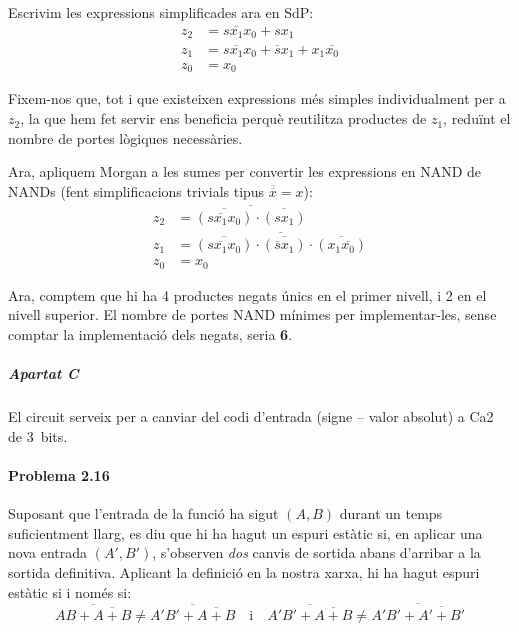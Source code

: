 Escrivim les expressions simplificades ara en SdP:
%
\begin{align*}
  z_2 &= s \overline{x_1} x_0 + s x_1 \\
  z_1 &= s \overline{x_1} x_0 + \overline{s} x_1 + x_1 \overline{x_0} \\
  z_0 &= x_0
\end{align*}

Fixem-nos que, tot i que existeixen expressions més simples individualment per a $z_2$, la que hem fet servir ens beneficia perquè reutilitza productes de $z_1$, reduïnt el nombre de portes lògiques necessàries.

Ara, apliquem Morgan a les sumes per convertir les expressions en \textsf{NAND} de \textsf{NAND}s (fent simplificacions trivials tipus $\overline{\overline{x}} = x$):
%
\begin{align*}
  z_2 &= \overline{
    \overline{\left(s \overline{x_1} x_0\right)} \cdot
    \overline{\left(s x_1\right)}
  } \\
  z_1 &= \overline{
    \overline{\left(s \overline{x_1} x_0\right)} \cdot
    \overline{\left(\overline{s} x_1\right)} \cdot
    \overline{\left(x_1 \overline{x_0}\right)}
  } \\
  z_0 &= x_0
\end{align*}

Ara, comptem que hi ha 4 productes negats únics en el primer nivell, i 2 en el nivell superior. El nombre de portes \textsf{NAND} mínimes per implementar-les, sense comptar la implementació dels negats, seria \textbf{6}.


\subparagraph{Apartat C}

El circuit serveix per a canviar del codi d'entrada (signe -- valor absolut) a Ca2 de 3~bits.

\finishpage


\page
\paragraph{Problema 2.16}

Suposant que l'entrada de la funció ha sigut $(A,B)$ durant un temps suficientment llarg, es diu que hi ha hagut un espuri estàtic si, en aplicar una nova entrada $(A',B')$, s'observen \emph{dos} canvis de sortida abans d'arribar a la sortida definitiva. Aplicant la definició en la nostra xarxa, hi ha hagut espuri estàtic si i només si:
%
\begin{equation*}
  \overline{AB + \overline{A+B}} \neq \overline{A'B' + \overline{A+B}}
    \quad \text{i} \quad
  \overline{A'B' + \overline{A+B}} \neq \overline{A'B' + \overline{A'+B'}}
\end{equation*}


